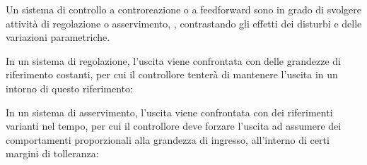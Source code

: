 \documentclass{article}
\numberwithin{equation}{subsection}
\begin{document}
Un sistema di controllo a controreazione o a feedforward sono in grado di svolgere attività di regolazione o asservimento, , contrastando gli effetti dei disturbi e 
delle variazioni parametriche. 


In un sistema di regolazione, l'uscita viene confrontata con delle grandezze di riferimento costanti, per cui il controllore tenterà di mantenere l'uscita in un intorno 
di questo riferimento:

\begin{center}
\end{center}

In un sistema di asservimento, l'uscita viene confrontata con dei riferimenti varianti nel tempo, per cui il controllore deve forzare l'uscita ad assumere dei comportamenti 
proporzionali alla grandezza di ingresso, all'interno di certi margini di tolleranza: 

\begin{center}
\end{center}
\end{document}
